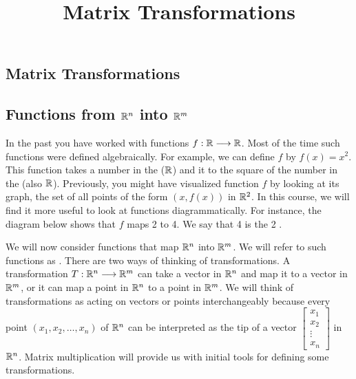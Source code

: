 \documentclass{ximera}
\title{Matrix Transformations} \license{CC BY-NC-SA 4.0}
\begin{document}
\begin{abstract}
\end{abstract}
\maketitle

\begin{onlineOnly}
\section*{Matrix Transformations}
\end{onlineOnly}

\subsection*{Functions from $\mathbb{R}^n$ into $\mathbb{R}^m$}
In the past you have worked with functions $f:\mathbb{R}\longrightarrow \mathbb{R}$.  Most of the time such functions were defined algebraically.  For example, we can define $f$ by $f(x)=x^2$.  This function takes a number in the  ($\mathbb{R}$) and  it to the square of the number in the  (also $\mathbb{R}$).  Previously, you might have visualized function $f$ by looking at its graph, the set of all points of the form $(x, f(x))$ in $\mathbb{R}^2$.  In this course, we will find it more useful to look at functions diagrammatically.  For instance, the diagram below shows that $f$ maps 2 to 4.  We say that 4 is the  2 .
\begin{center}
\end{center}

We will now consider functions that map $\mathbb{R}^n$ into $\mathbb{R}^m$.  We will refer to such functions as .  There are two ways of thinking of transformations.  A transformation $T:\mathbb{R}^n\longrightarrow\mathbb{R}^m$ can take a vector in $\mathbb{R}^n$ and map it to a vector in $\mathbb{R}^m$, or it can map a point in $\mathbb{R}^n$ to a point in $\mathbb{R}^m$.  We will think of transformations as acting on vectors or points interchangeably because every point $(x_1, x_2,\dots ,x_n)$ of $\mathbb{R}^n$ can be interpreted as the tip of a vector $\begin{bmatrix}x_1\\x_2\\\vdots\\x_n\end{bmatrix}$ in $\mathbb{R}^n$.  Matrix multiplication will provide us with initial tools for defining some transformations.
\end{document}
